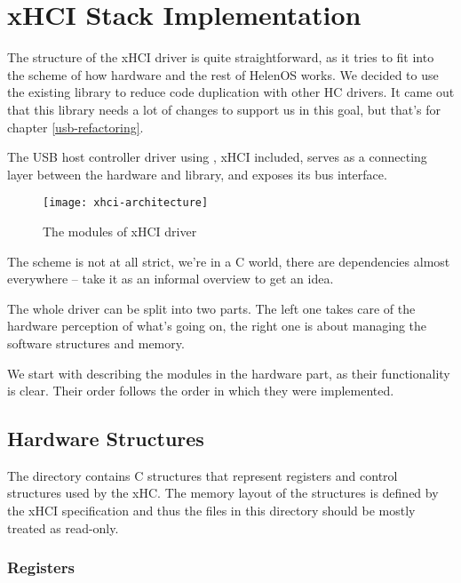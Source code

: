 \chapter{xHCI Stack Implementation}

The structure of the xHCI driver is quite straightforward, as it tries to fit
into the scheme of how hardware and the rest of HelenOS works. We decided to
use the existing library  to reduce code duplication with
other HC drivers. It came out that this library needs a lot of changes to
support us in this goal, but that's for chapter \ref{usb-refactoring}.

The USB host controller driver using , xHCI included, serves as
a connecting layer between the hardware and library, and exposes its bus
interface.

\begin{figure}[h]
	\centering
	\texttt{[image: xhci-architecture]}
	\caption{The modules of xHCI driver}
\end{figure}

The scheme is not at all strict, we're in a C world, there are dependencies
almost everywhere -- take it as an informal overview to get an idea.

The whole driver can be split into two parts. The left one takes care of the
hardware perception of what's going on, the right one is about managing the
software structures and memory.

We start with describing the modules in the hardware part, as their
functionality is clear. Their order follows the order in which they were
implemented.

\section{Hardware Structures}

The  directory contains C structures
that represent registers and control structures used by the xHC. The memory layout of the
structures is defined by the xHCI specification\cite{xhci} and thus the files in this directory should
be mostly treated as read-only.

\subsection{Registers}

